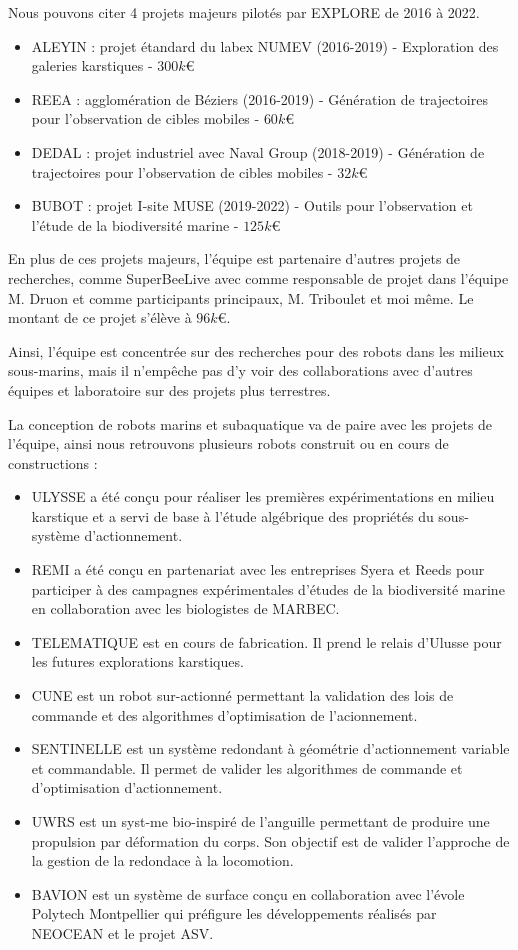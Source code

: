 \documentclass[11pt,french,a4paper]{report}
\begin{document}
Nous pouvons citer 4 projets majeurs pilotés par EXPLORE de 2016 à 2022. 
\begin{itemize}
    \item ALEYIN : projet étandard du labex NUMEV (2016-2019) - Exploration des galeries karstiques - $300k$\euro{}
    \item REEA : agglomération de Béziers (2016-2019) - Génération de trajectoires pour l'observation de cibles mobiles - $60k$\euro{} 
    \item DEDAL : projet industriel avec Naval Group (2018-2019) - Génération de trajectoires pour l'observation de cibles mobiles - $32k$\euro{} 
    \item BUBOT : projet I-site MUSE (2019-2022) - Outils pour l'observation et l'étude de la biodiversité marine - $125k$\euro{} 
\end{itemize}

En plus de ces projets majeurs, l'équipe est partenaire d'autres projets de recherches, comme SuperBeeLive avec comme responsable 
de projet dans l'équipe M. Druon et comme participants principaux, M. Triboulet et moi même. Le montant de ce projet 
s'élève à $96k$\euro{}.

Ainsi, l'équipe est concentrée sur des recherches pour des robots dans les milieux sous-marins, mais il n'empêche pas d'y voir
des collaborations avec d'autres équipes et laboratoire sur des projets plus terrestres. 

La conception de robots marins et subaquatique va de paire avec les projets de l'équipe, ainsi nous retrouvons plusieurs robots
construit ou en cours de constructions :
\begin{itemize}
    \item ULYSSE a été conçu pour réaliser les premières expérimentations en milieu karstique et a servi de 
        base à l'étude algébrique des propriétés du sous-système d'actionnement.
    \item REMI a été conçu en partenariat avec les entreprises Syera et Reeds pour participer à des
        campagnes expérimentales d'études de la biodiversité marine en collaboration avec les 
        biologistes de MARBEC.
    \item TELEMATIQUE est en cours de fabrication. Il prend le relais d'Ulusse pour les
        futures explorations karstiques. 
    \item CUNE est un robot sur-actionné permettant la validation des lois de commande et des 
        algorithmes d'optimisation de l'acionnement.
    \item SENTINELLE est un système redondant à géométrie d'actionnement variable et commandable. Il permet de
        valider les algorithmes de commande et d'optimisation d'actionnement. 
    \item UWRS est un syst-me bio-inspiré de l'anguille permettant de produire une propulsion par 
        déformation du corps. Son objectif est de valider l'approche de la gestion de la redondace à la locomotion.
    \item BAVION est un système de surface conçu en collaboration avec l'évole Polytech Montpellier qui préfigure les développements 
        réalisés par NEOCEAN et le projet ASV.
\end{itemize} 
\end{document}
